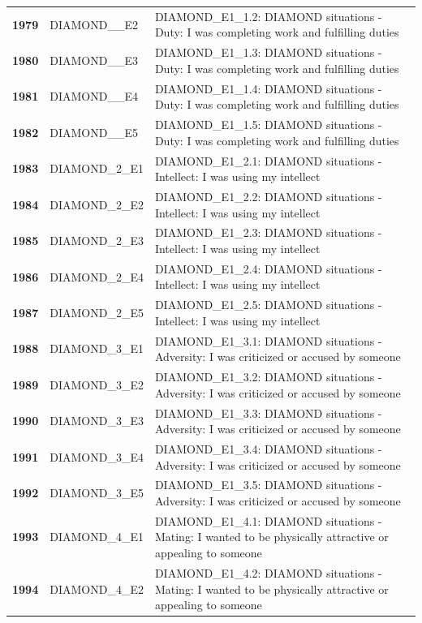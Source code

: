 \documentclass[
  letterpaper,
  DIV=11,
  numbers=noendperiod]{scrartcl}
\begin{document}
\begin{longtable}[t]{>{}cll}
\textbf{1979} & DIAMOND\_\_E2 & DIAMOND\_E1\_1.2: DIAMOND situations - Duty: I was completing work and fulfilling duties\\
\textbf{1980} & DIAMOND\_\_E3 & DIAMOND\_E1\_1.3: DIAMOND situations - Duty: I was completing work and fulfilling duties\\
\addlinespace
\textbf{1981} & DIAMOND\_\_E4 & DIAMOND\_E1\_1.4: DIAMOND situations - Duty: I was completing work and fulfilling duties\\
\textbf{1982} & DIAMOND\_\_E5 & DIAMOND\_E1\_1.5: DIAMOND situations - Duty: I was completing work and fulfilling duties\\
\textbf{1983} & DIAMOND\_2\_E1 & DIAMOND\_E1\_2.1: DIAMOND situations - Intellect: I was using my intellect\\
\textbf{1984} & DIAMOND\_2\_E2 & DIAMOND\_E1\_2.2: DIAMOND situations - Intellect: I was using my intellect\\
\textbf{1985} & DIAMOND\_2\_E3 & DIAMOND\_E1\_2.3: DIAMOND situations - Intellect: I was using my intellect\\
\addlinespace
\textbf{1986} & DIAMOND\_2\_E4 & DIAMOND\_E1\_2.4: DIAMOND situations - Intellect: I was using my intellect\\
\textbf{1987} & DIAMOND\_2\_E5 & DIAMOND\_E1\_2.5: DIAMOND situations - Intellect: I was using my intellect\\
\textbf{1988} & DIAMOND\_3\_E1 & DIAMOND\_E1\_3.1: DIAMOND situations - Adversity: I was criticized or accused by someone\\
\textbf{1989} & DIAMOND\_3\_E2 & DIAMOND\_E1\_3.2: DIAMOND situations - Adversity: I was criticized or accused by someone\\
\textbf{1990} & DIAMOND\_3\_E3 & DIAMOND\_E1\_3.3: DIAMOND situations - Adversity: I was criticized or accused by someone\\
\addlinespace
\textbf{1991} & DIAMOND\_3\_E4 & DIAMOND\_E1\_3.4: DIAMOND situations - Adversity: I was criticized or accused by someone\\
\textbf{1992} & DIAMOND\_3\_E5 & DIAMOND\_E1\_3.5: DIAMOND situations - Adversity: I was criticized or accused by someone\\
\textbf{1993} & DIAMOND\_4\_E1 & DIAMOND\_E1\_4.1: DIAMOND situations - Mating: I wanted to be physically attractive or appealing to someone\\
\textbf{1994} & DIAMOND\_4\_E2 & DIAMOND\_E1\_4.2: DIAMOND situations - Mating: I wanted to be physically attractive or appealing to someone\\

\end{longtable}
\end{document}

